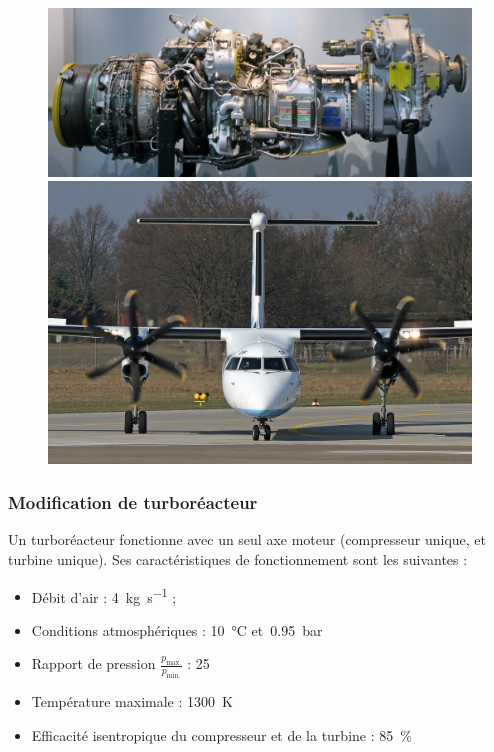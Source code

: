 	\begin{figure}
		\begin{center}
			\includegraphics[height=0.245\textwidth]{images/photo_pwc_pw123.jpg}
			\includegraphics[height=0.245\textwidth]{images/photo_dash8.jpg}
		\end{center}
		\label{fig_turboprop_photos}
	\end{figure}
		

\subsubsection{Modification de turboréacteur}

	Un turboréacteur fonctionne avec un seul axe moteur (compresseur unique, et turbine unique). Ses caractéristiques de fonctionnement sont les suivantes :
		\begin{itemize}
			\item Débit d’air :							\tab \SI{4}{\kilogram\per\second} ; 
			\item Conditions atmosphériques : 		\tab \SI{10}{\degreeCelsius} et~\SI{0,95}{\bar}
			\item Rapport de pression $\frac{p_\text{max.}}{p_\text{min.}}$ : 				\tab \num{25}
			\item Température maximale : 													\tab \SI{1300}{\kelvin}
			\item Efficacité isentropique du compresseur et de la turbine : 	\SI{85}{\percent}
		\end{itemize}
	
